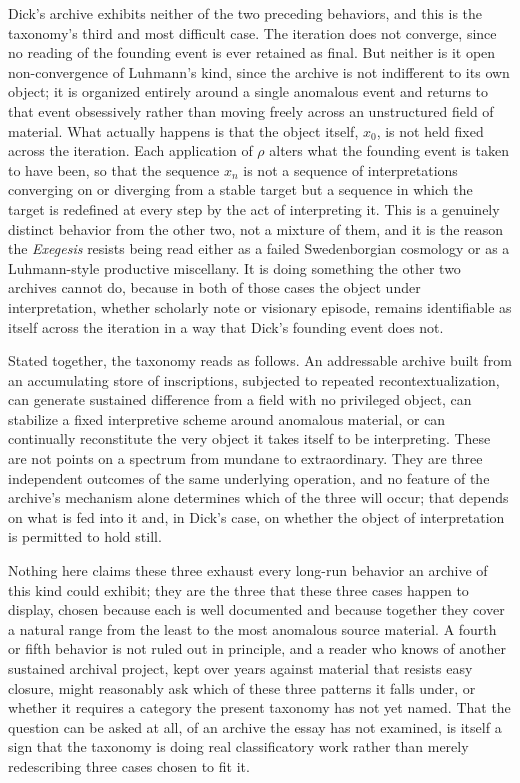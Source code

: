 \documentclass[11pt]{article}
\begin{document}
Dick's archive exhibits neither of the two preceding behaviors, and this is the taxonomy's third and most difficult case. The iteration does not converge, since no reading of the founding event is ever retained as final. But neither is it open non-convergence of Luhmann's kind, since the archive is not indifferent to its own object; it is organized entirely around a single anomalous event and returns to that event obsessively rather than moving freely across an unstructured field of material. What actually happens is that the object itself, $x_0$, is not held fixed across the iteration. Each application of $\rho$ alters what the founding event is taken to have been, so that the sequence $x_n$ is not a sequence of interpretations converging on or diverging from a stable target but a sequence in which the target is redefined at every step by the act of interpreting it. This is a genuinely distinct behavior from the other two, not a mixture of them, and it is the reason the \emph{Exegesis} resists being read either as a failed Swedenborgian cosmology or as a Luhmann-style productive miscellany. It is doing something the other two archives cannot do, because in both of those cases the object under interpretation, whether scholarly note or visionary episode, remains identifiable as itself across the iteration in a way that Dick's founding event does not.

Stated together, the taxonomy reads as follows. An addressable archive built from an accumulating store of inscriptions, subjected to repeated recontextualization, can generate sustained difference from a field with no privileged object, can stabilize a fixed interpretive scheme around anomalous material, or can continually reconstitute the very object it takes itself to be interpreting. These are not points on a spectrum from mundane to extraordinary. They are three independent outcomes of the same underlying operation, and no feature of the archive's mechanism alone determines which of the three will occur; that depends on what is fed into it and, in Dick's case, on whether the object of interpretation is permitted to hold still.

Nothing here claims these three exhaust every long-run behavior an archive of this kind could exhibit; they are the three that these three cases happen to display, chosen because each is well documented and because together they cover a natural range from the least to the most anomalous source material. A fourth or fifth behavior is not ruled out in principle, and a reader who knows of another sustained archival project, kept over years against material that resists easy closure, might reasonably ask which of these three patterns it falls under, or whether it requires a category the present taxonomy has not yet named. That the question can be asked at all, of an archive the essay has not examined, is itself a sign that the taxonomy is doing real classificatory work rather than merely redescribing three cases chosen to fit it.
\end{document}
